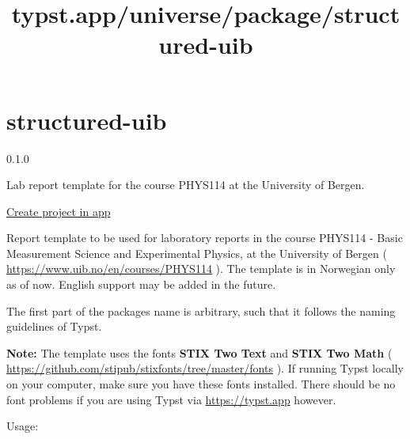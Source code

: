 \title{typst.app/universe/package/structured-uib}

\label{banner}
\label{template-thumbnail}

\section{structured-uib}\label{structured-uib}

{ 0.1.0 }

Lab report template for the course PHYS114 at the University of Bergen.

\href{/app?template=structured-uib&version=0.1.0}{Create project in app}

\label{readme}
Report template to be used for laboratory reports in the course PHYS114
- Basic Measurement Science and Experimental Physics, at the University
of Bergen ( \url{https://www.uib.no/en/courses/PHYS114} ). The template
is in Norwegian only as of now. English support may be added in the
future.

The first part of the packages name is arbitrary, such that it follows
the naming guidelines of Typst.

\textbf{Note:} The template uses the fonts \textbf{STIX Two Text} and
\textbf{STIX Two Math} (
\url{https://github.com/stipub/stixfonts/tree/master/fonts} ). If
running Typst locally on your computer, make sure you have these fonts
installed. There should be no font problems if you are using Typst via
\href{https://typst.app/}{https://typst.app} however.

Usage:

\begin{Shaded}
\begin{Highlighting}[]

\NormalTok{  ),}
\NormalTok{  ),}
\NormalTok{)}

\end{Highlighting}
\end{Shaded}

